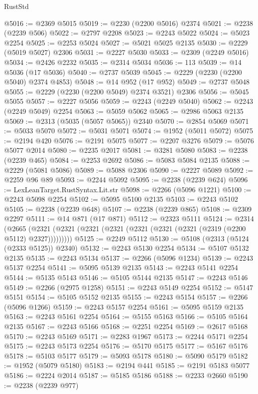 \begin{lexlean}{RustStd}
\begin{coremodule}
@5016 := @2369 @5015
@5019 := @2230 (@2200 @5016) @2374
@5021 := @2238 (@2239 @506)
@5022 := @2797 @2208
@5023 := @2243 @5022
@5024 := @5023 @2254
@5025 := @2253 @5024
@5027 := @5021 @5025 @2135
@5030 := @2229 (@5019 @5027) @2306
@5031 := @2227 @5030
@5033 := @2309 (@2249 @5016)
@5034 := @2426 @2232
@5035 := @2314 @5034
@5036 := 113
@5039 := @14 @5036 (@17 @5036)
@5040 := @2737 @5039
@5045 := @2229 (@2230 (@2200 @5040) @2374 @4853)
@5048 := @14 @952 (@17 @952)
@5049 := @2737 @5048
@5055 := @2229 (@2230 (@2200 @5049) @2374 @3521) @2306
@5056 := @5045 @5055
@5057 := @2227 @5056
@5059 := @2243 (@2249 @5040)
@5062 := @2243 (@2249 @5049) @2254
@5063 := @5059 @5062
@5065 := @2986 @5063 @2135
@5069 := @2313 (@5035 (@5057 @5065)) @2340
@5070 := @2854 @5069
@5071 := @5033 @5070
@5072 := @5031 @5071
@5074 := @1952 (@5011 @5072)
@5075 := @2194 @420
@5076 := @2191 @5075
@5077 := @2207 @3276
@5079 := @5076 @5077 @2014
@5080 := @2235 @2017
@5081 := @3281 @5080
@5083 := @2238 (@2239 @465)
@5084 := @2253 @2692
@5086 := @5083 @5084 @2135
@5088 := @2229 (@5081 @5086)
@5089 := @5088 @2306
@5090 := @2227 @5089
@5092 := @2259 @96 @89
@5093 := @2244 @5092
@5095 := @2238 (@2239 @624)
@5096 := LexLeanTarget.RustSyntax.Lit.str
@5098 := @2266 (@5096 @1221)
@5100 := @2243 @5098 @2254
@5102 := @5095 @5100 @2135
@5103 := @2243 @5102
@5105 := @2238 (@2239 @648)
@5107 := @2238 (@2239 @865)
@5108 := @2309 @2297
@5111 := @14 @871 (@17 @871)
@5112 := @2323 @5111
@5124 := @2314
    (@2665 (@2321 (@2321 (@2321 (@2321 (@2321 (@2321 (@2321 (@2319 (@2200 @5112) @2327)))))))))
@5125 := @2249 @5112
@5130 := @5108 (@2313 (@5124 (@2333 @5125)) @2340)
@5132 := @2243 @5130 @2254
@5134 := @5107 @5132 @2135
@5135 := @2243 @5134
@5137 := @2266 (@5096 @1234)
@5139 := @2243 @5137 @2254
@5141 := @5095 @5139 @2135
@5143 := @2243 @5141 @2254
@5144 := @5135 @5143
@5146 := @5105 @5144 @2135
@5147 := @2243 @5146
@5149 := @2266 (@2975 @1258)
@5151 := @2243 @5149 @2254
@5152 := @5147 @5151
@5154 := @5105 @5152 @2135
@5155 := @2243 @5154
@5157 := @2266 (@5096 @1266)
@5159 := @2243 @5157 @2254
@5161 := @5095 @5159 @2135
@5163 := @2243 @5161 @2254
@5164 := @5155 @5163
@5166 := @5105 @5164 @2135
@5167 := @2243 @5166
@5168 := @2251 @2254
@5169 := @2617 @5168
@5170 := @2243 @5169
@5171 := @2283 @1967
@5173 := @2244 @5171 @2254
@5175 := @2243 @5173 @2254
@5176 := @5170 @5175
@5177 := @5167 @5176
@5178 := @5103 @5177
@5179 := @5093 @5178
@5180 := @5090 @5179
@5182 := @1952 (@5079 @5180)
@5183 := @2194 @441
@5185 := @2191 @5183 @5077
@5186 := @2224 @2014
@5187 := @5185 @5186
@5188 := @2233 @2660
@5190 := @2238 (@2239 @977)

\end{coremodule}
\end{lexlean}
